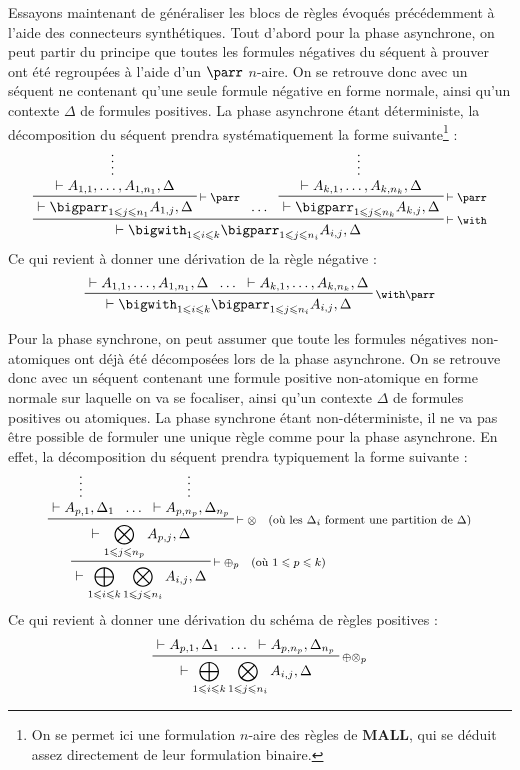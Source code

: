 \documentclass[12pt]{report}
\newcommand{\seq}{\vdash}
\newcommand{\irule}[1]{\footnotesize$#1$}
\newcommand{\iruleR}[1]{\irule{\seq{#1}}}
\begin{document}
Essayons maintenant de généraliser les blocs de règles évoqués précédemment à l'aide des connecteurs synthétiques. Tout d'abord pour la phase asynchrone, on peut partir du principe que toutes les formules négatives du séquent à prouver ont été regroupées à l'aide d'un $\parr$ $n$-aire. On se retrouve donc avec un séquent ne contenant qu'une seule formule négative en forme normale, ainsi qu'un contexte $\Delta$ de formules positives. La phase asynchrone étant déterministe, la décomposition du séquent prendra systématiquement la forme suivante\footnote{On se permet ici une formulation $n$-aire des règles de $\mathbf{MALL}$, qui se déduit assez directement de leur formulation binaire.} :
\begin{displaymath}
	\prftree[r]{\iruleR{\with}}
		{\prftree[r]{\iruleR{\parr}}
			{\prfsummary{\seq A_{1,1},\ldots,A_{1,n_1},\Delta}}
			{\seq \bigparr_{1 \leqslant j \leqslant n_1} A_{1,j},\Delta}}
		{\ldots}
		{\prftree[r]{\iruleR{\parr}}
			{\prfsummary{\seq A_{k,1},\ldots,A_{k,n_k},\Delta}}
			{\seq \bigparr_{1 \leqslant j \leqslant n_k} A_{k,j},\Delta}}
		{\seq \bigwith_{1 \leqslant i \leqslant k} \bigparr_{1 \leqslant j \leqslant n_i} A_{i,j},\Delta}
\end{displaymath}
Ce qui revient à donner une dérivation de la règle négative :
\begin{displaymath}
	\prftree[r]{\irule{\with\parr}}
		{\seq A_{1,1},\ldots,A_{1,n_1},\Delta}
		{\ldots}
		{\seq A_{k,1},\ldots,A_{k,n_k},\Delta}
		{\seq \bigwith_{1 \leqslant i \leqslant k} \bigparr_{1 \leqslant j \leqslant n_i} A_{i,j},\Delta}
\end{displaymath}

Pour la phase synchrone, on peut assumer que toute les formules négatives non-atomiques ont déjà été décomposées lors de la phase asynchrone. On se retrouve donc avec un séquent contenant une formule positive non-atomique en forme normale sur laquelle on va se focaliser, ainsi qu'un contexte $\Delta$ de formules positives ou atomiques. La phase synchrone étant non-déterministe, il ne va pas être possible de formuler une unique règle comme pour la phase asynchrone. En effet, la décomposition du séquent prendra typiquement la forme suivante :
\begin{displaymath}
	\prftree[r]{\iruleR{\oplus_p \quad (\text{où } 1 \leqslant p \leqslant k)}}
		{\prftree[r]{\iruleR{\otimes \quad (\text{où les } \Delta_i \text{ forment une partition de } \Delta)}}
			{\prfsummary{\seq A_{p,1},\Delta_1}}
			{\ldots}
			{\prfsummary{\seq A_{p,n_p},\Delta_{n_p}}}
			{\seq \bigotimes_{1 \leqslant j \leqslant n_p} A_{p,j},\Delta}}
		{\seq \bigoplus_{1 \leqslant i \leqslant k} \bigotimes_{1 \leqslant j \leqslant n_i} A_{i,j},\Delta}
\end{displaymath}
Ce qui revient à donner une dérivation du schéma de règles positives :
\begin{displaymath}
	\prftree[r]{\irule{\oplus\otimes_p}}
		{\seq A_{p,1},\Delta_1}
		{\ldots}
		{\seq A_{p,n_p},\Delta_{n_p}}
	{\seq \bigoplus_{1 \leqslant i \leqslant k} \bigotimes_{1 \leqslant j \leqslant n_i} A_{i,j},\Delta}
\end{displaymath}
\end{document}
